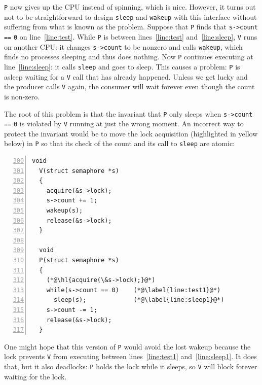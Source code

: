 
\lstinline{P}
now gives up the CPU instead of spinning, which is nice.
However, it turns out not to be straightforward to design
\lstinline{sleep}
and 
\lstinline{wakeup}
with this interface without suffering
from what is known as the  problem.
Suppose that
\lstinline{P}
finds that
\lstinline{s->count}
\lstinline{==}
\lstinline{0} 
on line~\ref{line:test}.
While
\lstinline{P}
is between lines~\ref{line:test} and~\ref{line:sleep},
\lstinline{V}
runs on another CPU:
it changes
\lstinline{s->count}
to be nonzero and calls
\lstinline{wakeup},
which finds no processes sleeping and thus does nothing.
Now
\lstinline{P}
continues executing at line~\ref{line:sleep}:
it calls
\lstinline{sleep}
and goes to sleep.
This causes a problem:
\lstinline{P}
is asleep waiting for a \lstinline{V} call
that has already happened.
Unless we get lucky and the producer calls
\lstinline{V} again, the consumer will wait
forever even
though the count is non-zero.

The root of this problem is that the
invariant that
\lstinline{P}
only sleeps when
\lstinline{s->count}
\lstinline{==}
\lstinline{0}
is violated by 
\lstinline{V}
running at just the wrong moment.
An incorrect way to protect the invariant would be to 
move the lock acquisition (highlighted in yellow below) in
\lstinline{P}
so that its check of the count and its call to \lstinline{sleep}
are atomic:
\begin{lstlisting}[numbers=left,firstnumber=300]
  void
  V(struct semaphore *s)
  {
    acquire(&s->lock);
    s->count += 1;
    wakeup(s);
    release(&s->lock);
  }
  
  void
  P(struct semaphore *s)
  {
    (*@\hl{acquire(\&s->lock);}@*)
    while(s->count == 0)    (*@\label{line:test1}@*)
      sleep(s);             (*@\label{line:sleep1}@*)
    s->count -= 1;
    release(&s->lock);
  }
\end{lstlisting}
One might hope that this version of
\lstinline{P}
would avoid the lost wakeup because the lock prevents
\lstinline{V}
from executing between lines~\ref{line:test1} and~\ref{line:sleep1}.
It does that, but it also deadlocks:
\lstinline{P}
holds the lock while it sleeps,
so \lstinline{V} will block forever waiting for the lock.

